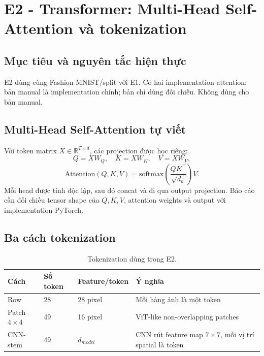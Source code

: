 \section{E2 - Transformer: Multi-Head Self-Attention và tokenization}

\subsection{Mục tiêu và nguyên tắc hiện thực}
E2 dùng cùng Fashion-MNIST/split với E1. Có hai implementation attention: bản manual là implementation chính; bản  chỉ dùng đối chiếu. Không dùng  cho bản manual.

\subsection{Multi-Head Self-Attention tự viết}
Với token matrix $X\in\mathbb{R}^{T\times d}$, các projection được học riêng:
\begin{equation}
Q=XW_Q,\quad K=XW_K,\quad V=XW_V,
\end{equation}
\begin{equation}
\mathrm{Attention}(Q,K,V)=\mathrm{softmax}\left(\frac{QK^\top}{\sqrt{d_k}}\right)V.
\end{equation}
Mỗi head được tính độc lập, sau đó concat và đi qua output projection. Báo cáo cần đối chiếu tensor shape của $Q,K,V$, attention weights và output với implementation PyTorch.

\subsection{Ba cách tokenization}
\begin{table}[H]\centering
\caption{Tokenization dùng trong E2.}
\begin{tabularx}{0.94\textwidth}{@{}lXXX@{}}
\toprule
Cách & Số token & Feature/token & Ý nghĩa \\
\midrule
Row & 28 & 28 pixel & Mỗi hàng ảnh là một token \\
Patch $4\times4$ & 49 & 16 pixel & ViT-like non-overlapping patches \\
CNN-stem & 49 & $d_{model}$ & CNN rút feature map $7\times7$, mỗi vị trí spatial là token \\
\bottomrule
\end{tabularx}
\end{table}

